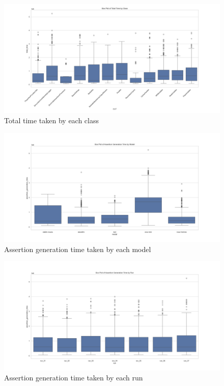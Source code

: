 \begin{figure}[H]
\centering
\includegraphics[width=1\textwidth]{images/total_time_by_class.png}
\caption{Total time taken by each class}
\label{fig:time_class}
\end{figure}

\begin{figure}[H]
\centering
\includegraphics[width=1\textwidth]{images/assertion_time_by_model.png}
\caption{Assertion generation time taken by each model}
\label{fig:assertion_time_models}
\end{figure}

\begin{figure}[H]
\centering
\includegraphics[width=1\textwidth]{images/assertion_time_by_runs.png}
\caption{Assertion generation time taken by each run}
\label{fig:assertion_time_runs}
\end{figure}

